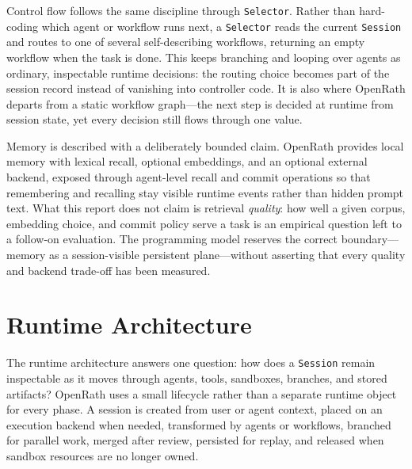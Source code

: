 \documentclass{llmxive}
\begin{document}
Control flow follows the same discipline through \texttt{Selector}. Rather than
hard-coding which agent or workflow runs next, a \texttt{Selector} reads the
current \texttt{Session} and routes to one of several self-describing
workflows, returning an empty workflow when the task is done. This keeps
branching and looping over agents as ordinary, inspectable runtime decisions:
the routing choice becomes part of the session record instead of vanishing into
controller code. It is also where OpenRath departs from a static workflow
graph---the next step is decided at runtime from session state, yet every
decision still flows through one value.

Memory is described with a deliberately bounded claim. OpenRath provides local
memory with lexical recall, optional embeddings, and an optional external
backend, exposed through agent-level recall and commit operations so that
remembering and recalling stay visible runtime events rather than hidden prompt
text. What this report does not claim is retrieval \emph{quality}: how well a
given corpus, embedding choice, and commit policy serve a task is an empirical
question left to a follow-on evaluation. The programming model reserves the
correct boundary---memory as a session-visible persistent plane---without
asserting that every quality and backend trade-off has been measured.


\section{Runtime Architecture}

The runtime architecture answers one question: how does a \texttt{Session}
remain inspectable as it moves through agents, tools, sandboxes, branches, and
stored artifacts? OpenRath uses a small lifecycle rather than a separate runtime
object for every phase. A session is created from user or agent context, placed
on an execution backend when needed, transformed by agents or workflows,
branched for parallel work, merged after review, persisted for replay, and
released when sandbox resources are no longer owned.
\end{document}
